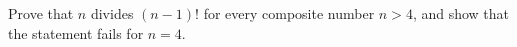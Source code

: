 Prove that $n$ divides $(n-1)!$ for every composite number $n>4$, and show that the statement fails for $n=4$.
